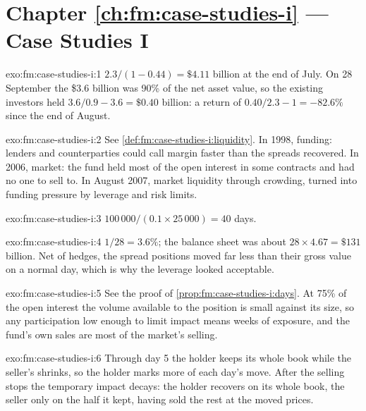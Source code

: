 \section*{Chapter \ref{ch:fm:case-studies-i} --- Case Studies I}

\begin{solution}{exo:fm:case-studies-i:1}
$2.3/(1-0.44)=\$4.11$ billion at the end of July. On 28 September the \$3.6 billion was 90\% of the net asset value, so the existing investors held
$3.6/0.9-3.6=\$0.40$ billion: a return of $0.40/2.3-1=-82.6\%$ since the end of August.
\end{solution}

\begin{solution}{exo:fm:case-studies-i:2}
See \cref{def:fm:case-studies-i:liquidity}. In 1998, funding: lenders and counterparties could call margin faster than the spreads recovered. In
2006, market: the fund held most of the open interest in some contracts and had no one to sell to. In August 2007, market liquidity through
crowding, turned into funding pressure by leverage and risk limits.
\end{solution}

\begin{solution}{exo:fm:case-studies-i:3}
$100\,000/(0.1\times25\,000)=40$ days.
\end{solution}

\begin{solution}{exo:fm:case-studies-i:4}
$1/28=3.6\%$; the balance sheet was about $28\times4.67=\$131$ billion. Net of hedges, the spread positions moved far less than their gross value on
a normal day, which is why the leverage looked acceptable.
\end{solution}

\begin{solution}{exo:fm:case-studies-i:5}
See the proof of \cref{prop:fm:case-studies-i:days}. At 75\% of the open interest the volume available to the position is small against its size,
so any participation low enough to limit impact means weeks of exposure, and the fund's own sales are most of the market's selling.
\end{solution}

\begin{solution}{exo:fm:case-studies-i:6}
Through day 5 the holder keeps its whole book while the seller's shrinks, so the holder marks more of each day's move. After the selling stops the
temporary impact decays: the holder recovers on its whole book, the seller only on the half it kept, having sold the rest at the moved prices.
\end{solution}

